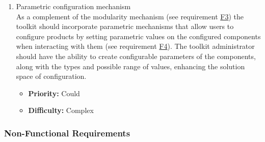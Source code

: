 \begin{enumerate}[label=\textbf{F\arabic*:}, leftmargin=*]
\item \label{itm:F20} Parametric configuration mechanism
\vspace{2pt}
\\As a complement of the modularity mechanism (see requirement \hyperref[itm:F3]{F3}) the toolkit should incorporate parametric mechanisms that allow users to configure products by setting parametric values on the configured components when interacting with them (see requirement \hyperref[itm:F4]{F4}). The toolkit administrator should have the ability to create configurable parameters of the components, along with the types and possible range of values, enhancing the solution space of configuration.
\begin{itemize}[noitemsep, label=\trianglebullet]
    \item \textbf{Priority:} Could
    \item \textbf{Difficulty:} Complex
\end{itemize}

\end{enumerate}


\subsubsection{Non-Functional Requirements}

